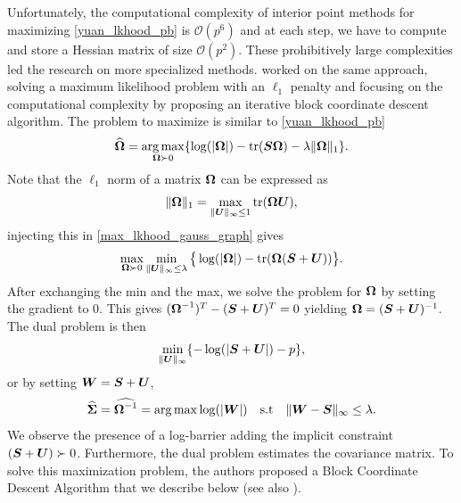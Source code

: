Unfortunately, the computational complexity of interior point methods for maximizing \cref{yuan_lkhood_pb} is $\mathcal O (p^6)$ and at each step, we have to compute and store a Hessian matrix of size $\mathcal O (p^2)$. These prohibitively large complexities led the research on more specialized methods. \citep{banerjee} worked on the same approach, solving a maximum likelihood problem with an $\ell_1$ penalty and focusing on the computational complexity by proposing an iterative block coordinate descent algorithm. The problem to maximize is similar to \cref{yuan_lkhood_pb}
\begin{equation}
\label{max_lkhood_gauss_graph}
  \widehat{\boldsymbol\Omega} = \operatorname*{arg\,max}_{\boldsymbol\Omega \succ 0}\{\log(|\boldsymbol\Omega|)-\textnormal{tr}(\boldsymbol S\boldsymbol\Omega)-\lambda\|\boldsymbol\Omega \|_1\}.
\end{equation}
Note that the $\ell_1$ norm of a matrix $\boldsymbol\Omega$ can be expressed as
\begin{equation}
  \|\boldsymbol\Omega \|_1 = \max_{\| \boldsymbol U\|_{\infty}\leq 1}\textnormal{tr}(\boldsymbol\Omega\boldsymbol U),
\end{equation}
injecting this in \cref{max_lkhood_gauss_graph} gives
\begin{equation}
  \max_{\boldsymbol\Omega \succ 0} \min_{\|\boldsymbol U\|_{\infty}\leq \lambda} \big\{\log(|\boldsymbol\Omega|)-\textnormal{tr}(\boldsymbol\Omega(\boldsymbol S+\boldsymbol U))\big\}.
\end{equation}
After exchanging the min and the max, we solve the problem for $\boldsymbol\Omega$ by setting the gradient to $0$. This gives $(\boldsymbol\Omega^{-1})^T-(\boldsymbol S+\boldsymbol U)^T=0$ yielding $\boldsymbol\Omega = (\boldsymbol S+\boldsymbol U)^{-1}$. The dual problem is then
\begin{equation}
  \min_{\|\boldsymbol U \|_{\infty}}\{-\log(|\boldsymbol S+\boldsymbol U|) -p\},
\end{equation}
or by setting $\boldsymbol W = \boldsymbol S+\boldsymbol U$,
\begin{equation}
\label{banerjee_min_pb}
  \widehat{\boldsymbol\Sigma} = \widehat{\boldsymbol\Omega^{-1}}= \operatorname*{arg\,max} \log(|\boldsymbol W|) \quad \textnormal{s.t}\quad \|\boldsymbol W-\boldsymbol S \|_{\infty} \leq \lambda.
\end{equation}
We observe the presence of a log-barrier adding the implicit constraint $(\boldsymbol S+\boldsymbol U) \succ 0$. Furthermore, the dual problem estimates the covariance matrix. To solve this maximization problem, the authors proposed a Block Coordinate Descent Algorithm that we describe below (see also ). 

